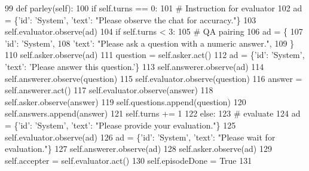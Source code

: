 \begin{DoxyCode}
99     \textcolor{keyword}{def }parley(self):
100         \textcolor{keywordflow}{if} self.turns == 0:
101             \textcolor{comment}{# Instruction for evaluator}
102             ad = \{\textcolor{stringliteral}{'id'}: \textcolor{stringliteral}{'System'}, \textcolor{stringliteral}{'text'}: \textcolor{stringliteral}{"Please observe the chat for accuracy."}\}
103             self.evaluator.observe(ad)
104         \textcolor{keywordflow}{if} self.turns < 3:
105             \textcolor{comment}{# QA pairing}
106             ad = \{
107                 \textcolor{stringliteral}{'id'}: \textcolor{stringliteral}{'System'},
108                 \textcolor{stringliteral}{'text'}: \textcolor{stringliteral}{"Please ask a question with a numeric answer."},
109             \}
110             self.asker.observe(ad)
111             question = self.asker.act()
112             ad = \{\textcolor{stringliteral}{'id'}: \textcolor{stringliteral}{'System'}, \textcolor{stringliteral}{'text'}: \textcolor{stringliteral}{'Please answer this question.'}\}
113             self.answerer.observe(ad)
114             self.answerer.observe(question)
115             self.evaluator.observe(question)
116             answer = self.answerer.act()
117             self.evaluator.observe(answer)
118             self.asker.observe(answer)
119             self.questions.append(question)
120             self.answers.append(answer)
121             self.turns += 1
122         \textcolor{keywordflow}{else}:
123             \textcolor{comment}{# evaluate}
124             ad = \{\textcolor{stringliteral}{'id'}: \textcolor{stringliteral}{'System'}, \textcolor{stringliteral}{'text'}: \textcolor{stringliteral}{"Please provide your evaluation."}\}
125             self.evaluator.observe(ad)
126             ad = \{\textcolor{stringliteral}{'id'}: \textcolor{stringliteral}{'System'}, \textcolor{stringliteral}{'text'}: \textcolor{stringliteral}{"Please wait for evaluation."}\}
127             self.answerer.observe(ad)
128             self.asker.observe(ad)
129             self.accepter = self.evaluator.act()
130             self.episodeDone = \textcolor{keyword}{True}
131 
\end{DoxyCode}
\mbox{\label{classparlai_1_1mturk_1_1tasks_1_1react__task__demo_1_1react__custom__no__extra__deps_1_1worlds_1_1MultiRoleAgentWorld_a1c07abe6eccf94d0a1f7af349d9aa36f}} 
